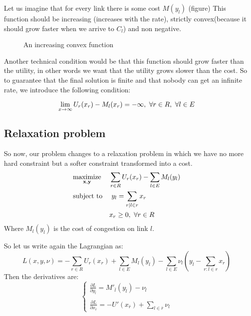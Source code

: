Let us imagine that for every link there is some cost $M(y_l)$ (figure)
This function should be increasing (increases with the rate), strictly convex(because it should grow faster when we arrive to $C_l$) and  non negative.

\begin{figure}[h]
	\centering
	\caption{An increasing convex function} \label{fig:3}
\end{figure}

Another technical condition would be that this function should grow faster than the utility, in other words we want that the utility grows slower than the cost. So to guarantee that the final solution is finite and that nobody can get an infinite rate, we introduce the following condition:
 
\begin{equation}
\lim_{x\to\infty} U_r(x_r)-M_l(x_r)=-\infty,\ \forall r \in R\\, \ \forall l \in E\\
\end{equation}

\subsection{Relaxation problem}
So now, our problem changes to a relaxation problem in which we have no more hard constraint but a softer constraint transformed into a cost.
\begin{equation}
\begin{aligned}
& \underset{\mathbf{x} , \mathbf{y} }{\text{maximize}}
& &  \sum_{r \in R} U_{r}(x_{r})- \sum_{l \in E} M_{l}(y_{l})\\
& \text{subject to}
& & \ y_l=\sum\limits_{r | l \in r} x_r \\
&      &&  x_{r} \geq 0,\ \forall r \in R\\
\end{aligned}
\label{Max2}
\end{equation}
Where $M_l(y_l)$ is the cost of congestion on link $l$.

So let us write again the Lagrangian as:
\begin{equation} 
L(x,y,\nu)= -\sum_{r \in R} U_{r}(x_{r}) + \sum_{l \in E} M_l(y_l)- \sum_{l \in E} \nu_l\left(y_l - \sum_{r:l \in r} x_r\right) 
\end{equation}
Then the derivatives are:
\begin{equation}
\label{e:M}
\begin{cases}
\frac{\partial L}{\partial y_{\bar{l}}}=M'_{\bar{l}}(y_{\bar{l}})-\nu_{\bar{l}}\\\\
\frac{\partial L}{\partial x_{\bar{r}}}=-U'( x_{\bar{r}}) + \sum_{l \in \bar{r}} \nu_l
\end{cases}
\end{equation}

